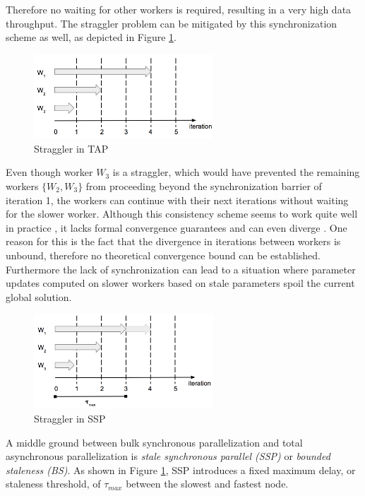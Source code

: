 Therefore no waiting for other workers is required, resulting in a very high data throughput.
The straggler problem can be mitigated by this synchronization scheme as well, as depicted in Figure \ref{fig:tap_straggler}.
\begin{figure}[ht]
\centering
\includegraphics[width=0.6\textwidth]{img/tap_straggler.png}
\caption{Straggler in TAP}
\label{fig:tap_straggler}
\end{figure}
Even though worker $W_3$ is a straggler, which would have prevented the remaining workers $\{W_2, W_3\}$ from proceeding beyond the synchronization barrier of iteration 1, the workers can continue with their next iterations without waiting for the slower worker.
Although this consistency scheme seems to work quite well in practice \cite{Li2014}, it lacks formal convergence guarantees and can even diverge \cite{dai2014high}.
One reason for this is the fact that the divergence in iterations between workers is unbound, therefore no theoretical convergence bound can be established.
Furthermore the lack of synchronization can lead to a situation where parameter updates computed on slower workers based on stale parameters spoil the current global solution. 
\begin{figure}[ht]
\centering
\includegraphics[width=0.6\textwidth]{img/ssp_straggler.png}
\caption{Straggler in SSP}
\label{fig:ssp_straggler}
\end{figure}
A middle ground between bulk synchronous parallelization and total asynchronous parallelization is \textit{stale synchronous parallel (SSP)} \cite{ho2013more} or \textit{bounded staleness (BS)}.
As shown in Figure \ref{fig:tap_straggler}, SSP introduces a fixed maximum delay, or staleness threshold, of $\tau_{max}$ between the slowest and fastest node.
